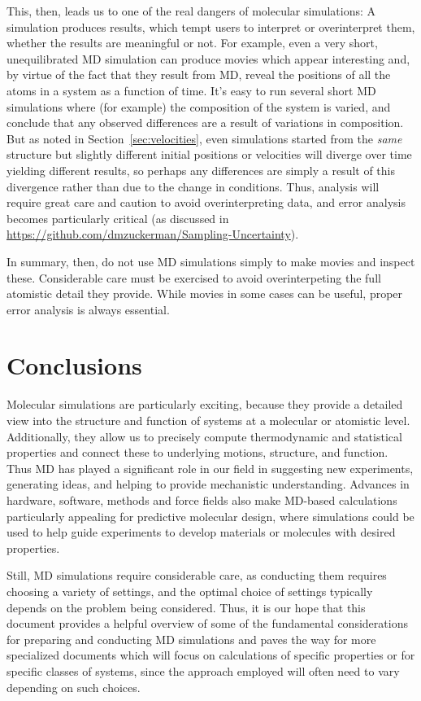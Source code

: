 \documentclass[9pt,bestpractices]{livecoms}
\begin{document}
This, then, leads us to one of the real dangers of molecular simulations: A simulation produces results, which tempt users to interpret or overinterpret them, whether the results are meaningful or not.
For example, even a very short, unequilibrated MD simulation can produce movies which appear interesting and, by virtue of the fact that they result from MD, reveal the positions of all the atoms in a system as a function of time. 
It's easy to run several short MD simulations where (for example) the composition of the system is varied, and conclude that any observed differences are a result of variations in composition.
But as noted in Section~\ref{sec:velocities}, even simulations started from the \emph{same} structure but slightly different initial positions or velocities will diverge over time yielding different results, so perhaps any differences are simply a result of this divergence rather than due to the change in conditions.
Thus, analysis will require great care and caution to avoid overinterpreting data, and error analysis becomes particularly critical (as discussed in \url{https://github.com/dmzuckerman/Sampling-Uncertainty}).

In summary, then, do not use MD simulations simply to make movies and inspect these. Considerable care must be exercised to avoid overinterpeting the full atomistic detail they provide. 
While movies in some cases can be useful, proper error analysis is always essential.



\section{Conclusions}
Molecular simulations are particularly exciting, because they provide a detailed view into the structure and function of systems at a molecular or atomistic level.
Additionally, they allow us to precisely compute thermodynamic and statistical properties and connect these to underlying motions, structure, and function.
Thus MD has played a significant role in our field in suggesting new experiments, generating ideas, and helping to provide mechanistic understanding.
Advances in hardware, software, methods and force fields also make MD-based calculations particularly appealing for predictive molecular design, where simulations could be used to help guide experiments to develop materials or molecules with desired properties.

Still, MD simulations require considerable care, as conducting them requires choosing a variety of settings, and the optimal choice of settings typically depends on the problem being considered.
Thus, it is our hope that this document provides a helpful overview of some of the fundamental considerations for preparing and conducting MD simulations and paves the way for more specialized documents which will focus on calculations of specific properties or for specific classes of systems, since the approach employed will often need to vary depending on such choices.
\end{document}
